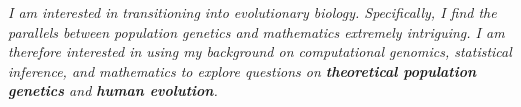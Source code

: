 \begin{cventries}
{\begin{cvitems}
            \item {
            \begin{flushleft}
              \textit{I am interested in transitioning into evolutionary biology.
              Specifically, I find the parallels between population genetics and
              mathematics extremely intriguing. I am therefore
              interested in using my background on computational genomics,
              statistical inference, and mathematics to explore
              questions on \textbf{theoretical population genetics} and \textbf{human evolution}.}
          \end{flushleft}
            }
          \end{cvitems}
        }
        
\end{cventries}
